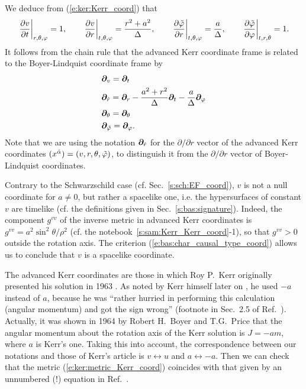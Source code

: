 We deduce from (\ref{e:ker:Kerr_coord}) that
\[
    \left. \frac{\partial v}{\partial t} \right| _{r,\theta,\varphi} = 1, \qquad
    \left. \frac{\partial v}{\partial r} \right| _{t,\theta,\varphi} = \frac{r^2 + a^2}{\Delta},\qquad
    \left. \frac{\partial {\tilde\varphi}}{\partial r} \right| _{t,\theta,\varphi} = \frac{a}{\Delta},\qquad
    \left. \frac{\partial {\tilde\varphi}}{\partial \varphi} \right| _{t,r,\theta} = 1.
\]
It follows from the chain rule that
the advanced Kerr coordinate frame
is related to the Boyer-Lindquist coordinate frame by
\begin{subequations}
\label{e:ker:frame_Kerr_BL}
\begin{align}
    & \bm{\partial}_v = \bm{\partial}_t \\
    & \bm{\partial}_{\hat{r}} = \bm{\partial}_r - \frac{a^2+r^2}{\Delta} \bm{\partial}_t
                        - \frac{a}{\Delta} \bm{\partial}_\varphi \label{e:ker:frame_Kerr_BL_r}\\
    & \bm{\partial}_\theta = \bm{\partial}_\theta \\
    & \bm{\partial}_{{\tilde\varphi}} = \bm{\partial}_\varphi .
\end{align}
\end{subequations}
Note that we are using the notation $\bm{\partial}_{\hat{r}}$ for the $\partial/\partial r$
vector of the advanced Kerr coordinates $(x^{\hat{\alpha}}) = (v,r,\theta,{\tilde\varphi})$, to distinguish
it from the $\partial/\partial r$ vector of Boyer-Lindquist coordinates.

\begin{remark}
Contrary to the Schwarzschild case (cf. Sec.~\ref{s:sch:EF_coord}), $v$ is not a null coordinate
for $a\neq 0$, but rather a spacelike one, i.e. the hypersurfaces of constant $v$
are timelike (cf. the definitions given in Sec.~\ref{s:bas:signature}). Indeed,
the component $g^{vv}$ of the inverse metric in advanced Kerr coordinates is
$g^{vv} = a^2 \sin^2\theta /\rho^2$ (cf. the notebook~\ref{s:sam:Kerr_Kerr_coord}-1),
so that $g^{vv} > 0$ outside the rotation
axis. The criterion (\ref{e:bas:char_causal_type_coord}) allows us to conclude
that $v$ is a spacelike coordinate.
\end{remark}

\begin{hist} \label{h:ker:Kerr_coord}
The advanced Kerr coordinates are those in which Roy P.~Kerr originally presented his
solution in 1963 \cite{Kerr63}. As noted by Kerr himself later on \cite{Kerr09}, he used $-a$ instead of $a$,
because he was ``rather hurried in performing
this calculation (angular momentum) and got the sign wrong'' (footnote in Sec.~2.5 of
Ref.~\cite{Kerr09}).
Actually, it was shown in 1964
by Robert H.~Boyer and
T.G.~Price \cite{BoyerP65}
that the angular momentum about the rotation axis of the Kerr solution is $J=- a m$,
where $a$ is Kerr's one.
Taking this into account, the correspondence between our notations and those of Kerr's article \cite{Kerr63}
is $v\leftrightarrow u$ and $a\leftrightarrow -a$. Then we can check that
the metric (\ref{e:ker:metric_Kerr_coord}) coincides with that given
by an unnumbered (!) equation in Ref.~\cite{Kerr63}.
\end{hist}


